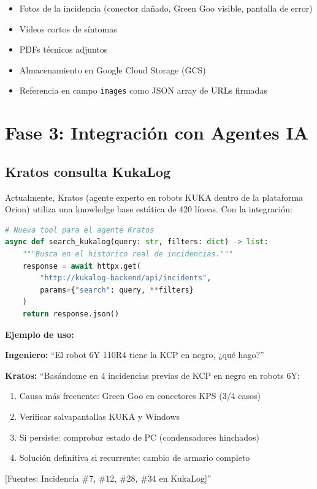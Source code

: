 \documentclass[11pt,a4paper]{article}
\begin{document}
\begin{itemize}[noitemsep]
    \item Fotos de la incidencia (conector dañado, Green Goo visible, pantalla de error)
    \item Vídeos cortos de síntomas
    \item PDFs técnicos adjuntos
    \item Almacenamiento en Google Cloud Storage (GCS)
    \item Referencia en campo \texttt{images} como JSON array de URLs firmadas
\end{itemize}

\section{Fase 3: Integración con Agentes IA}

\subsection{Kratos consulta KukaLog}

Actualmente, Kratos (agente experto en robots KUKA dentro de la plataforma Orion) utiliza una knowledge base estática de 420 líneas. Con la integración:

\begin{lstlisting}[language=python]
# Nueva tool para el agente Kratos
async def search_kukalog(query: str, filters: dict) -> list:
    """Busca en el historico real de incidencias."""
    response = await httpx.get(
        "http://kukalog-backend/api/incidents",
        params={"search": query, **filters}
    )
    return response.json()
\end{lstlisting}

\textbf{Ejemplo de uso:}

\begin{infobox}
\textbf{Ingeniero:} ``El robot 6Y 110R4 tiene la KCP en negro, ¿qué hago?''

\textbf{Kratos:} ``Basándome en 4 incidencias previas de KCP en negro en robots 6Y:
\begin{enumerate}[noitemsep]
    \item Causa más frecuente: Green Goo en conectores KPS (3/4 casos)
    \item Verificar salvapantallas KUKA y Windows
    \item Si persiste: comprobar estado de PC (condensadores hinchados)
    \item Solución definitiva si recurrente: cambio de armario completo
\end{enumerate}
[Fuentes: Incidencia \#7, \#12, \#28, \#34 en KukaLog]''
\end{infobox}
\end{document}
